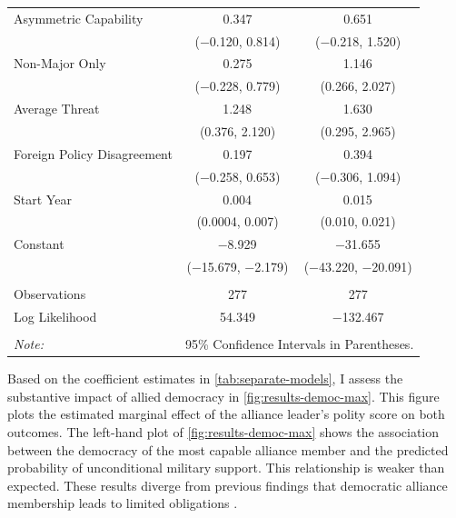 \documentclass[12pt]{article}
\begin{document}
\begin{table}[!htbp]
\begin{tabular}{@{\extracolsep{5pt}}lcc}
  Asymmetric Capability & 0.347 & 0.651 \\ 
  & ($-$0.120, 0.814) & ($-$0.218, 1.520) \\ 
  Non-Major Only & 0.275 & 1.146$^{}$ \\ 
  & ($-$0.228, 0.779) & (0.266, 2.027) \\ 
  Average Threat & 1.248$^{}$ & 1.630$^{}$ \\ 
  & (0.376, 2.120) & (0.295, 2.965) \\ 
  Foreign Policy Disagreement & 0.197 & 0.394 \\ 
  & ($-$0.258, 0.653) & ($-$0.306, 1.094) \\ 
  Start Year & 0.004$^{}$ & 0.015$^{}$ \\ 
  & (0.0004, 0.007) & (0.010, 0.021) \\ 
  Constant & $-$8.929$^{}$ & $-$31.655$^{}$ \\ 
  & ($-$15.679, $-$2.179) & ($-$43.220, $-$20.091) \\ 
 \hline \\[-1.8ex] 
Observations & 277 & 277 \\ 
Log Likelihood & 54.349 & $-$132.467 \\ 
\hline 
\hline \\[-1.8ex] 
\textit{Note:}  & \multicolumn{2}{r}{95\% Confidence Intervals in Parentheses.} \\ 
\end{tabular} 
\end{table} 


Based on the coefficient estimates in \autoref{tab:separate-models}, I assess the substantive impact of allied democracy in \autoref{fig:results-democ-max}.
This figure plots the estimated marginal effect of the alliance leader's polity score on both outcomes. 
The left-hand plot of \autoref{fig:results-democ-max} shows the association between the democracy of the most capable alliance member and the predicted probability of unconditional military support. 
This relationship is weaker than expected.  
These results diverge from previous findings that democratic alliance membership leads to limited obligations \citep{Mattes2012, Chibaetal2015}.
\end{document}
